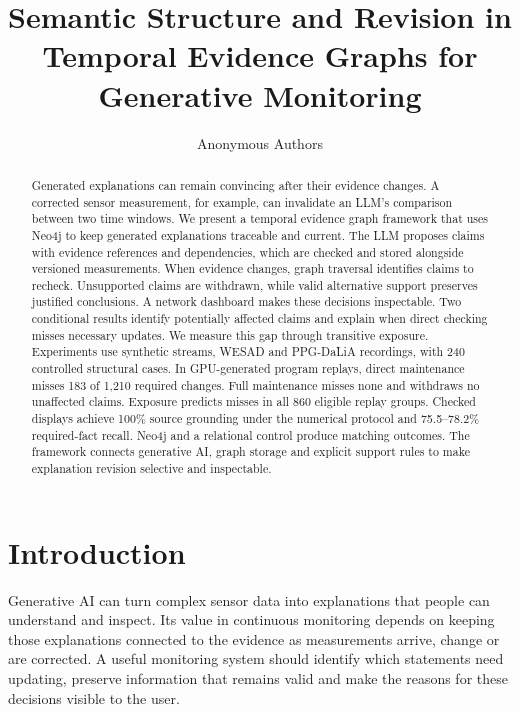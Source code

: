 \documentclass[runningheads]{llncs}
\begin{document}
\title{Semantic Structure and Revision in Temporal Evidence Graphs for Generative Monitoring}
\author{Anonymous Authors}
\maketitle
\begin{abstract}
Generated explanations can remain convincing after their evidence changes.
A corrected sensor measurement, for example, can invalidate an LLM's
comparison between two time windows. We present a temporal evidence graph
framework that uses Neo4j to keep generated explanations traceable and
current. The LLM proposes claims with evidence references and dependencies,
which are checked and stored alongside versioned measurements. When evidence
changes, graph traversal identifies claims to recheck. Unsupported claims
are withdrawn, while valid alternative support preserves justified
conclusions. A network dashboard makes these decisions inspectable.
Two conditional results identify potentially affected claims and explain
when direct checking misses necessary updates. We measure this gap through
transitive exposure. Experiments use synthetic streams, WESAD and PPG-DaLiA
recordings, with 240 controlled structural cases. In GPU-generated program
replays, direct maintenance misses 183 of 1,210 required changes.
Full maintenance misses none and withdraws no unaffected claims.
Exposure predicts misses in all 860 eligible replay groups.
Checked displays achieve 100\% source grounding under the numerical
protocol and 75.5--78.2\% required-fact recall. Neo4j and a relational control
produce matching outcomes. The framework connects generative AI, graph
storage and explicit support rules to make explanation revision selective
and inspectable.
\end{abstract}



\section{Introduction}

Generative AI can turn complex sensor data into explanations that people can
understand and inspect. Its value in continuous monitoring depends on keeping
those explanations connected to the evidence as measurements arrive, change
or are corrected. A useful monitoring system should identify which statements
need updating, preserve information that remains valid and make the reasons
for these decisions visible to the user.
\end{document}

